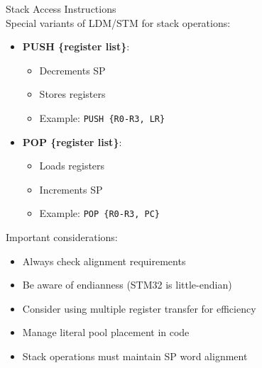 \begin{concept}{Stack Access Instructions}\\
Special variants of LDM/STM for stack operations:
\begin{itemize}
  \item \textbf{PUSH \{register list\}}:
    \begin{itemize}
      \item Decrements SP
      \item Stores registers
      \item Example: \texttt{PUSH \{R0-R3, LR\}}
    \end{itemize}
  \item \textbf{POP \{register list\}}:
    \begin{itemize}
      \item Loads registers
      \item Increments SP
      \item Example: \texttt{POP \{R0-R3, PC\}}
    \end{itemize}
\end{itemize}
\end{concept}

\begin{remark}
Important considerations:
\begin{itemize}
  \item Always check alignment requirements
  \item Be aware of endianness (STM32 is little-endian)
  \item Consider using multiple register transfer for efficiency
  \item Manage literal pool placement in code
  \item Stack operations must maintain SP word alignment
\end{itemize}
\end{remark}